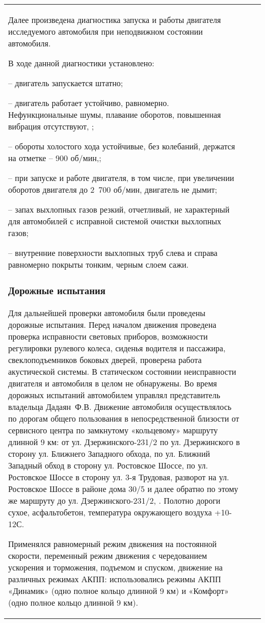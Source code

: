 \begin{longtable}{G{25mm}|M{44mm}|G{70mm}}
Далее произведена диагностика запуска и работы двигателя исследуемого автомобиля при неподвижном состоянии  автомобиля. 

В ходе данной диагностики установлено:

-- двигатель запускается штатно;

-- двигатель работает устойчиво, равномерно. Нефункциональные шумы, плавание оборотов, повышенная вибрация отсутствуют, ;

-- обороты холостого хода устойчивые, без колебаний, держатся на отметке – 900 об/мин,;

-- при запуске и работе двигателя, в том числе, при увеличении оборотов двигателя до 2 700 об/мин, двигатель не дымит;

-- запах выхлопных газов резкий, отчетливый, не характерный для автомобилей с исправной системой очистки выхлопных газов;

-- внутренние поверхности выхлопных труб слева и справа равномерно покрыты тонким, черным слоем сажи.
 	         	

\subsubsection{Дорожные испытания}
 
 Для дальнейшей проверки автомобиля были проведены дорожные испытания. Перед началом движения  проведена проверка исправности световых приборов, возможности регулировки рулевого колеса, сиденья водителя и пассажира, свеклоподъемников боковых дверей, проверена работа акустической системы. В статическом состоянии неисправности двигателя и  автомобиля в целом не обнаружены. Во время дорожных испытаний  автомобилем управлял представитель владельца Дадаян~Ф.В. Движение автомобиля осуществлялось по дорогам общего пользования в непосредственной близости от  сервисного центра по замкнутому «кольцевому» маршруту длинной 9 км: от ул. Дзержинского-231/2 по ул. Дзержинского в сторону ул. Ближнего Западного обхода, по ул. Ближний Западный обход в сторону ул. Ростовское Шоссе, по ул. Ростовское Шоссе в сторону ул. 3-я Трудовая, разворот на ул. Ростовское Шоссе в районе дома 30/5 и далее обратно по этому же маршруту до ул. Дзержинского-231/2, .  Полотно дороги сухое, асфальтобетон, температура окружающего воздуха +10-12 С. 
   
 Применялся  равномерный режим движения на постоянной скорости, переменный режим движения с чередованием ускорения и торможения, подъемом и спуском,  движение на различных режимах АКПП: использовались  режимы АКПП «Динамик» (одно полное кольцо длинной 9 км) и «Комфорт» (одно полное кольцо длинной 9 км).
 

\end{longtable}
